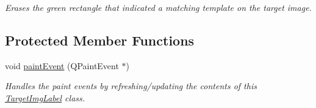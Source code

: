 \begin{CompactItemize}
\begin{CompactList}\small\item\em Erases the green rectangle that indicated a matching template on the target image. \item\end{CompactList}\end{CompactItemize}
\subsection*{Protected Member Functions}
\begin{CompactItemize}
\item 
\hypertarget{classTargetImgLabel_30f9fc1657bdf5a9459bd78d5a94c65b}{
void \hyperlink{classTargetImgLabel_30f9fc1657bdf5a9459bd78d5a94c65b}{paintEvent} (QPaintEvent $\ast$)}
\label{classTargetImgLabel_30f9fc1657bdf5a9459bd78d5a94c65b}

\begin{CompactList}\small\item\em Handles the paint events by refreshing/updating the contents of this \hyperlink{classTargetImgLabel}{TargetImgLabel} class. \item\end{CompactList}\end{CompactItemize}

